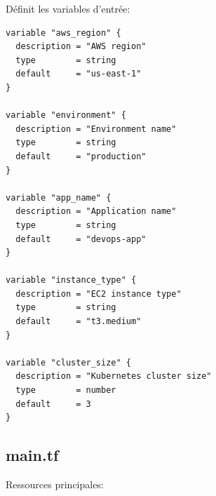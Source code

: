 \documentclass[12pt,a4paper]{report}
\begin{document}
Définit les variables d'entrée:

\lstset{language=hcl}
\begin{lstlisting}
variable "aws_region" {
  description = "AWS region"
  type        = string
  default     = "us-east-1"
}

variable "environment" {
  description = "Environment name"
  type        = string
  default     = "production"
}

variable "app_name" {
  description = "Application name"
  type        = string
  default     = "devops-app"
}

variable "instance_type" {
  description = "EC2 instance type"
  type        = string
  default     = "t3.medium"
}

variable "cluster_size" {
  description = "Kubernetes cluster size"
  type        = number
  default     = 3
}
\end{lstlisting}

\subsection{main.tf}

Ressources principales:
\end{document}
